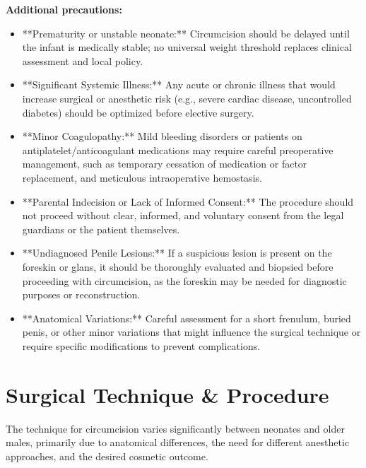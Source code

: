 \textbf{Additional precautions:}
\begin{itemize}
  \item **Prematurity or unstable neonate:** Circumcision should be delayed until the infant is medically stable; no universal weight threshold replaces clinical assessment and local policy.
  \item **Significant Systemic Illness:** Any acute or chronic illness that would increase surgical or anesthetic risk (e.g., severe cardiac disease, uncontrolled diabetes) should be optimized before elective surgery.
  \item **Minor Coagulopathy:** Mild bleeding disorders or patients on antiplatelet/anticoagulant medications may require careful preoperative management, such as temporary cessation of medication or factor replacement, and meticulous intraoperative hemostasis.
  \item **Parental Indecision or Lack of Informed Consent:** The procedure should not proceed without clear, informed, and voluntary consent from the legal guardians or the patient themselves.
  \item **Undiagnosed Penile Lesions:** If a suspicious lesion is present on the foreskin or glans, it should be thoroughly evaluated and biopsied before proceeding with circumcision, as the foreskin may be needed for diagnostic purposes or reconstruction.
  \item **Anatomical Variations:** Careful assessment for a short frenulum, buried penis, or other minor variations that might influence the surgical technique or require specific modifications to prevent complications.
\end{itemize}

\section*{Surgical Technique \& Procedure}
The technique for circumcision varies significantly between neonates and older males, primarily due to anatomical differences, the need for different anesthetic approaches, and the desired cosmetic outcome.

